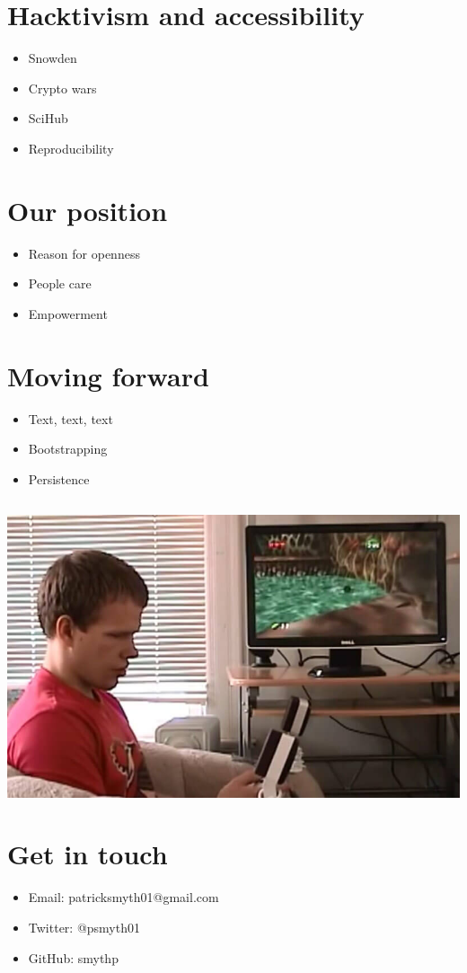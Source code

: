 \documentclass[11pt]{article}
\begin{document}
\section*{Hacktivism and accessibility}
\label{sec:orgheadline17}
\begin{itemize}
\item Snowden
\item Crypto wars
\item SciHub
\item Reproducibility
\end{itemize}
\section*{Our position}
\label{sec:orgheadline18}
\begin{itemize}
\item Reason for openness
\item People care
\item Empowerment
\end{itemize}
\section*{Moving forward}
\label{sec:orgheadline20}
\begin{itemize}
\item Text, text, text
\item Bootstrapping
\item Persistence
\end{itemize}
\subsection*{}
\label{sec:orgheadline19}
\includegraphics[width=.9\linewidth]{./images/zelda.jpg}
\section*{Get in touch}
\label{sec:orgheadline21}
\begin{itemize}
\item Email: patricksmyth01@gmail.com
\item Twitter: @psmyth01
\item GitHub: smythp
\end{itemize}
\end{document}
